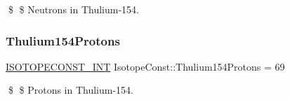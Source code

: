 \$ \$ Neutrons in Thulium-\/154. \mbox{\label{group___isotope_const-_thulium-_tm154_ga017d54e8014a8529d7495c8fc0adcc52}} 
\subsubsection{\texorpdfstring{Thulium154\+Protons}{Thulium154Protons}}
{\footnotesize\ttfamily \mbox{\hyperlink{group___isotope_const-_macros_ga5f18360b3e99483a35c32d789e62621c}{I\+S\+O\+T\+O\+P\+E\+C\+O\+N\+S\+T\+\_\+\+I\+NT}} Isotope\+Const\+::\+Thulium154\+Protons = 69}

\$ \$ Protons in Thulium-\/154. 